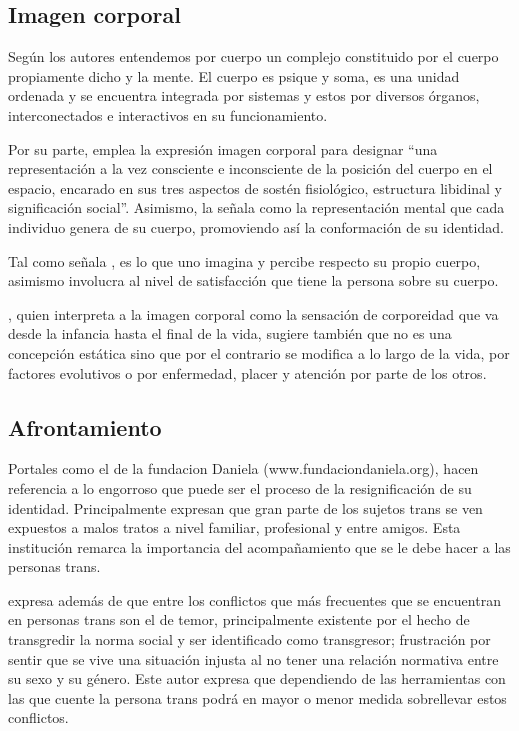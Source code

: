 \subsection{Imagen corporal}

Según los autores \textcite{Kottow2005} entendemos por cuerpo un complejo
constituido por el cuerpo propiamente dicho y la mente. El cuerpo es psique y
soma, es una unidad ordenada y se encuentra integrada por sistemas y estos por
diversos órganos, interconectados e interactivos en su funcionamiento.

Por su parte, \textcite{Schilder1999} emplea la expresión imagen corporal para
designar “una representación a la vez consciente e inconsciente de la posición
del cuerpo en el espacio, encarado en sus tres aspectos de sostén fisiológico,
estructura libidinal y significación social”. Asimismo, la señala como la
representación mental que cada individuo genera de su cuerpo, promoviendo así la
conformación de su identidad.

Tal como señala \textcite{Schilder1999}, es lo que uno imagina y percibe
respecto  su propio cuerpo, asimismo involucra al nivel de satisfacción que
tiene la persona sobre su cuerpo.

\textcite{Rosenbaum1979}, quien interpreta a la imagen corporal como la
sensación de corporeidad que va desde la infancia hasta el final de la vida,
sugiere también que no es una concepción estática sino que por el contrario se
modifica a lo largo de la vida, por factores evolutivos o por enfermedad, placer
y atención por parte de los otros.

\subsection{Afrontamiento}

Portales como el de la  fundacion Daniela
(www.fundaciondaniela.org), hacen referencia a lo engorroso que puede ser el
proceso de la resignificación de su identidad. Principalmente expresan que gran
parte de los sujetos trans se ven expuestos a malos tratos a nivel familiar,
profesional y entre amigos. Esta institución remarca la importancia del
acompañamiento que se le debe hacer a las personas trans.

\textcite{Salin-Pascual2008} expresa además de que entre los conflictos que más
frecuentes que se encuentran en personas trans son el de temor, principalmente
existente por el hecho de transgredir la norma social y ser identificado como
transgresor;  frustración por sentir que se vive una situación injusta al no
tener una relación normativa entre su sexo y su género. Este autor expresa que
dependiendo de las herramientas con las que cuente la persona trans podrá en
mayor o menor medida sobrellevar estos conflictos.

